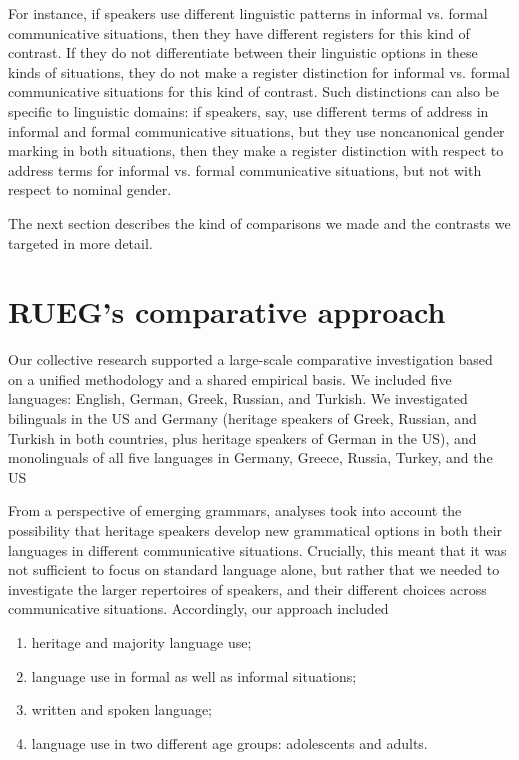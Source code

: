 \documentclass[output=paper,colorlinks,citecolor=brown]{langscibook}
\begin{document}
For instance, if speakers use different linguistic patterns in informal vs. formal communicative situations, then they have different registers for this kind of contrast. If they do not differentiate between their linguistic options in these kinds of situations, they do not make a register distinction for informal vs. formal communicative situations for this kind of contrast. Such distinctions can also be specific to linguistic domains: if speakers, say, use different terms of address in informal and formal communicative situations, but they use noncanonical gender marking in both situations, then they make a register distinction with respect to address terms for informal vs. formal communicative situations, but not with respect to nominal gender.

The next section describes the kind of comparisons we made and the contrasts we targeted in more detail.


\section{RUEG’s comparative approach} \label{sec:introwieseetal:comparative}

Our collective research supported a large-scale comparative investigation based on a unified methodology and a shared empirical basis. We included five languages: English, German, Greek, Russian, and Turkish. We investigated bilinguals in the US and Germany (heritage speakers of Greek, Russian, and Turkish in both countries, plus heritage speakers of German in the US), and monolinguals of all five languages in Germany, Greece, Russia, Turkey, and the US

From a perspective of emerging grammars, analyses took into account the possibility that heritage speakers develop new grammatical options in both their languages in different communicative situations. Crucially, this meant that it was not sufficient to focus on standard language alone, but rather that we needed to investigate the larger repertoires of speakers, and their different choices across communicative situations. Accordingly, our approach included

\begin{enumerate}[label=(\alph*)]
\item heritage and majority language use;
\item language use in formal as well as informal situations;
\item written and spoken language;
\item language use in two different age groups: adolescents and adults.
\end{enumerate}
\end{document}
